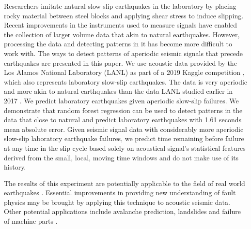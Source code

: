 \documentclass[]{llncs} %
\begin{document}
Researchers imitate natural slow slip earthquakes in the laboratory by placing rocky material between steel blocks and applying shear stress to induce slipping. Recent improvements in the instruments \cite{kaggle} used to measure signals have enabled the collection of larger volume data that akin to natural earthquakes. However, processing the data and detecting patterns in it has become more difficult to work with. The ways to detect patterns of aperiodic seismic signals that precede earthquakes are presented in this paper. We use acoustic data provided by the Los Alamos National Laboratory (LANL) as part of a 2019 Kaggle competition \cite{kaggle}, which also represents laboratory slow-slip earthquakes. The data is very aperiodic and more akin to natural earthquakes than the data LANL studied earlier in 2017 \cite{kaggle}. We predict laboratory earthquakes given aperiodic slow-slip failures. We demonstrate that random forest regression can be used to detect patterns in the data that close to natural and predict laboratory earthquakes with 1.61 seconds mean absolute error. Given seismic signal data with considerably more aperiodic slow-slip laboratory earthquake failures, we predict time remaining before failure at any time in the slip cycle based solely on acoustical signal's statistical features derived from the small, local, moving time windows and do not make use of its history.\par

The results of this experiment are potentially applicable to the field of real world earthquakes \cite{Bertrand}. Essential improvements in providing new understanding of fault physics may be brought by applying this technique to acoustic seismic data. Other potential applications include avalanche prediction, landslides and failure of machine parts \cite{Bertrand}. \par
\end{document}
